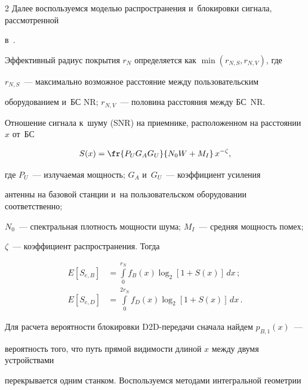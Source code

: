 \begin{multicols}{2}
Далее воспользуемся моделью распространения и~блокировки сигнала, рассмотренной 


в~\cite{ivanova2022performance}.


Эффективный радиус покрытия $r_N$ определяется как $\min(r_{N,S},r_{N,V})$, где 


$r_{N,S}$~--- максимально возможное расстояние между пользовательским 


оборудованием и~БС NR; $r_{N,V}$~--- половина расстояния меж\-ду БС~NR.





Отношение сигнала к~шуму (SNR) на приемнике, расположенном на расстоянии~$x$ от~БС


\begin{equation*}




S(x)=\fr{P_{U}G_{A}G_{U}}{N_0W+M_I}\,x^{-\zeta},


\end{equation*}


где $P_{U}$~--- излучаемая мощность; $G_{A}$ и~$G_{U}$~--- коэффициент усиления 


антенны на базовой станции и~на пользовательском оборудовании соответственно; 


$N_0$~--- спектральная плотность мощности шума; $M_I$~--- средняя мощность помех; 


$\zeta$~--- коэффициент распространения. Тогда





\noindent


\begin{align*}




E[S_{e,B}]&=\int\limits_{0}^{r_N}f_{B}(x)\log_{2}[1+S(x)]\,dx\,;\\


E[S_{e,D}]&=\int\limits_{0}^{2r_N}f_{D}(x)\log_{2}[1+S(x)]\,dx\,.


\end{align*}





Для расчета вероятности блокировки D2D-пе\-ре\-да\-чи сначала найдем $p_{B,1}(x)$~--- 


вероятность того, что путь прямой видимости длиной $x$ между двумя устройствами 


перекрывается одним станком. Воспользуемся методами интегральной геометрии 



\end{multicols}
